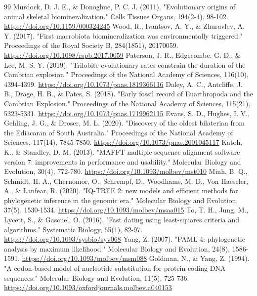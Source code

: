 \documentclass[10pt,letterpaper]{article}
\begin{document}
\begin{thebibliography}{99}
 Murdock, D. J. E., \& Donoghue, P. C. J. (2011). "Evolutionary origins of animal skeletal biomineralization." Cells Tissues Organs, 194(2-4), 98-102. \url{https://doi.org/10.1159/000324245}
 Wood, R., Ivantsov, A. Y., \& Zhuravlev, A. Y. (2017). "First macrobiota biomineralization was environmentally triggered." Proceedings of the Royal Society B, 284(1851), 20170059. \url{https://doi.org/10.1098/rspb.2017.0059}
 Paterson, J. R., Edgecombe, G. D., \& Lee, M. S. Y. (2019). "Trilobite evolutionary rates constrain the duration of the Cambrian explosion." Proceedings of the National Academy of Sciences, 116(10), 4394-4399. \url{https://doi.org/10.1073/pnas.1819366116}
 Daley, A. C., Antcliffe, J. B., Drage, H. B., \& Pates, S. (2018). "Early fossil record of Euarthropoda and the Cambrian Explosion." Proceedings of the National Academy of Sciences, 115(21), 5323-5331. \url{https://doi.org/10.1073/pnas.1719962115}
 Evans, S. D., Hughes, I. V., Gehling, J. G., \& Droser, M. L. (2020). "Discovery of the oldest bilaterian from the Ediacaran of South Australia." Proceedings of the National Academy of Sciences, 117(14), 7845-7850. \url{https://doi.org/10.1073/pnas.2001045117}
 Katoh, K., \& Standley, D. M. (2013). "MAFFT multiple sequence alignment software version 7: improvements in performance and usability." Molecular Biology and Evolution, 30(4), 772-780. \url{https://doi.org/10.1093/molbev/mst010}
 Minh, B. Q., Schmidt, H. A., Chernomor, O., Schrempf, D., Woodhams, M. D., Von Haeseler, A., \& Lanfear, R. (2020). "IQ-TREE 2: new models and efficient methods for phylogenetic inference in the genomic era." Molecular Biology and Evolution, 37(5), 1530-1534. \url{https://doi.org/10.1093/molbev/msaa015}
 To, T. H., Jung, M., Lycett, S., \& Gascuel, O. (2016). "Fast dating using least-squares criteria and algorithms." Systematic Biology, 65(1), 82-97. \url{https://doi.org/10.1093/sysbio/syv068}
 Yang, Z. (2007). "PAML 4: phylogenetic analysis by maximum likelihood." Molecular Biology and Evolution, 24(8), 1586-1591. \url{https://doi.org/10.1093/molbev/msm088}
 Goldman, N., \& Yang, Z. (1994). "A codon-based model of nucleotide substitution for protein-coding DNA sequences." Molecular Biology and Evolution, 11(5), 725-736. \url{https://doi.org/10.1093/oxfordjournals.molbev.a040153}
\end{thebibliography}
\end{document}
